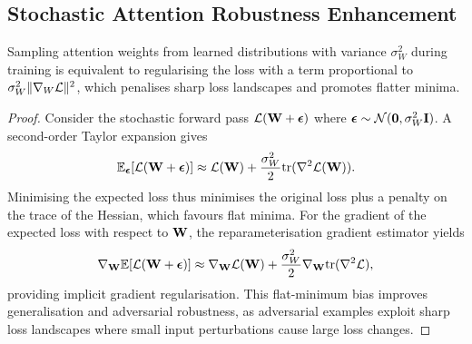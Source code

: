 \subsection{Stochastic Attention Robustness Enhancement}
\label{app:stoch_attention}

\begin{proposition}
Sampling attention weights from learned distributions with variance $\sigma_W^2$ during training is equivalent to regularising the loss with a term proportional to $\sigma_W^2\|\nabla_W\mathcal{L}\|^2$, which penalises sharp loss landscapes and promotes flatter minima.
\end{proposition}

\begin{proof}
Consider the stochastic forward pass $\mathcal{L}(\mathbf{W}+\bm{\epsilon})$ where $\bm{\epsilon}\sim\mathcal{N}(\mathbf{0},\sigma_W^2\mathbf{I})$. A second-order Taylor expansion gives
\begin{equation}
\mathbb{E}_{\bm{\epsilon}}[\mathcal{L}(\mathbf{W}+\bm{\epsilon})]
\approx \mathcal{L}(\mathbf{W}) + \frac{\sigma_W^2}{2}\mathrm{tr}(\nabla^2\mathcal{L}(\mathbf{W})).
\end{equation}
Minimising the expected loss thus minimises the original loss plus a penalty on the trace of the Hessian, which favours flat minima. For the gradient of the expected loss with respect to $\mathbf{W}$, the reparameterisation gradient estimator yields
\begin{equation}
\nabla_{\mathbf{W}}\mathbb{E}[\mathcal{L}(\mathbf{W}+\bm{\epsilon})] \approx \nabla_{\mathbf{W}}\mathcal{L}(\mathbf{W}) + \frac{\sigma_W^2}{2}\nabla_{\mathbf{W}}\mathrm{tr}(\nabla^2\mathcal{L}),
\end{equation}
providing implicit gradient regularisation. This flat-minimum bias improves generalisation and adversarial robustness, as adversarial examples exploit sharp loss landscapes where small input perturbations cause large loss changes.
\end{proof}
